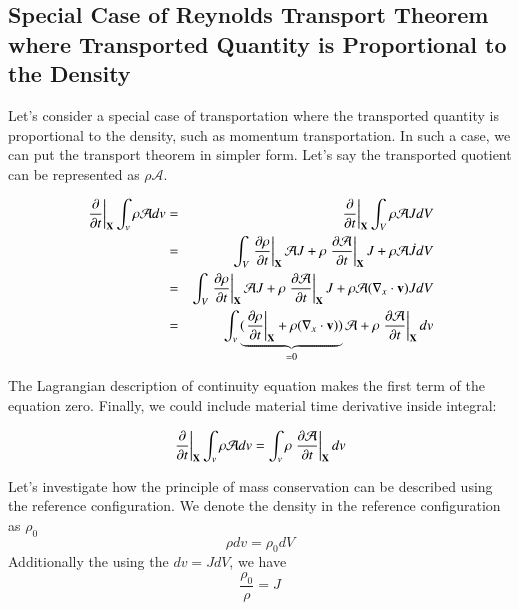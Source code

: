 \subsection{Special Case of Reynolds Transport Theorem where Transported Quantity is Proportional to the Density}

Let's consider a special case of transportation where the transported quantity is proportional to the density, such as momentum transportation.
%
In such a case, we can put the transport theorem in simpler form.
%
Let's say the transported quotient can be represented as $\rho\mathcal{A}$. 

\begin{eqnarray}
\left.\frac{\partial}{\partial{t}}\right|_{\mathbf{X}} \int_v \rho {\mathcal{A}} dv
&=& \left.\frac{\partial}{\partial{t}}\right|_{\mathbf{X}} \int_V \rho {\mathcal{A}} J dV\\	
&=& \int_V \left.\frac{\partial\rho}{\partial{t}}\right|_{\mathbf{X}} {\mathcal{A}} J	+ \rho \left.\frac{\partial\mathcal{A}}{\partial{t}}\right|_{\mathbf{X}} J + \rho {\mathcal{A}} \dot{J} dV\\
&=& \int_V \left.\frac{\partial\rho}{\partial{t}}\right|_{\mathbf{X}} {\mathcal{A}} J + \rho \left.\frac{\partial\mathcal{A}}{\partial{t}}\right|_{\mathbf{X}} J + \rho {\mathcal{A}} ( \nabla_x \cdot {\mathbf{v}} ) J dV\\
&=& \int_v \underbrace{( \left.\frac{\partial\rho}{\partial{t}}\right|_{\mathbf{X}} + \rho ( \nabla_x \cdot {\mathbf{v}} ) ) }_{=0} {\mathcal{A}} + \rho \left.\frac{\partial\mathcal{A}}{\partial{t}}\right|_{\mathbf{X}} dv
\end{eqnarray}


The Lagrangian description of continuity equation makes the first term of the equation zero. 
%
Finally, we could include material time derivative inside integral:
%
\begin{tcolorbox}[title=special case of Reynolds transport theorem]
\begin{equation} 
\label{eqn:special_reynolds_transportation}
\left.\frac{\partial}{\partial{t}}\right|_{\mathbf{X}} \int_v \rho {\mathcal{A}} dv 
= \int_v \rho \left.\frac{\partial\mathcal{A}}{\partial{t}}\right|_{\mathbf{X}} dv	
\end{equation}
\end{tcolorbox}

Let's investigate how the principle of mass conservation can be described using the reference  configuration.
%
We denote the density in the reference configuration as $\rho_0$
%
\begin{equation}
 {\rho}dv = {\rho_0}dV 
\end{equation}
%
Additionally the using the $dv=JdV$, we have 
%
\begin{equation}
\frac{\rho_0}{\rho} = J 
\end{equation}

